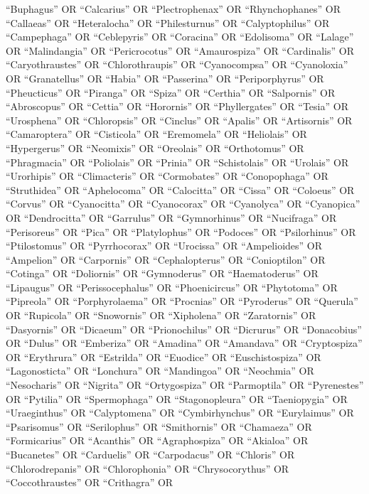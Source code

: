 \documentclass[
  number,
  review,
  onecolumn]{elsarticle}
\begin{document}
``Buphagus'' OR ``Calcarius'' OR ``Plectrophenax'' OR ``Rhynchophanes''
OR ``Callaeas'' OR ``Heteralocha'' OR ``Philesturnus'' OR
``Calyptophilus'' OR ``Campephaga'' OR ``Ceblepyris'' OR ``Coracina'' OR
``Edolisoma'' OR ``Lalage'' OR ``Malindangia'' OR ``Pericrocotus'' OR
``Amaurospiza'' OR ``Cardinalis'' OR ``Caryothraustes'' OR
``Chlorothraupis'' OR ``Cyanocompsa'' OR ``Cyanoloxia'' OR
``Granatellus'' OR ``Habia'' OR ``Passerina'' OR ``Periporphyrus'' OR
``Pheucticus'' OR ``Piranga'' OR ``Spiza'' OR ``Certhia'' OR
``Salpornis'' OR ``Abroscopus'' OR ``Cettia'' OR ``Horornis'' OR
``Phyllergates'' OR ``Tesia'' OR ``Urosphena'' OR ``Chloropsis'' OR
``Cinclus'' OR ``Apalis'' OR ``Artisornis'' OR ``Camaroptera'' OR
``Cisticola'' OR ``Eremomela'' OR ``Heliolais'' OR ``Hypergerus'' OR
``Neomixis'' OR ``Oreolais'' OR ``Orthotomus'' OR ``Phragmacia'' OR
``Poliolais'' OR ``Prinia'' OR ``Schistolais'' OR ``Urolais'' OR
``Urorhipis'' OR ``Climacteris'' OR ``Cormobates'' OR ``Conopophaga'' OR
``Struthidea'' OR ``Aphelocoma'' OR ``Calocitta'' OR ``Cissa'' OR
``Coloeus'' OR ``Corvus'' OR ``Cyanocitta'' OR ``Cyanocorax'' OR
``Cyanolyca'' OR ``Cyanopica'' OR ``Dendrocitta'' OR ``Garrulus'' OR
``Gymnorhinus'' OR ``Nucifraga'' OR ``Perisoreus'' OR ``Pica'' OR
``Platylophus'' OR ``Podoces'' OR ``Psilorhinus'' OR ``Ptilostomus'' OR
``Pyrrhocorax'' OR ``Urocissa'' OR ``Ampelioides'' OR ``Ampelion'' OR
``Carpornis'' OR ``Cephalopterus'' OR ``Conioptilon'' OR ``Cotinga'' OR
``Doliornis'' OR ``Gymnoderus'' OR ``Haematoderus'' OR ``Lipaugus'' OR
``Perissocephalus'' OR ``Phoenicircus'' OR ``Phytotoma'' OR ``Pipreola''
OR ``Porphyrolaema'' OR ``Procnias'' OR ``Pyroderus'' OR ``Querula'' OR
``Rupicola'' OR ``Snowornis'' OR ``Xipholena'' OR ``Zaratornis'' OR
``Dasyornis'' OR ``Dicaeum'' OR ``Prionochilus'' OR ``Dicrurus'' OR
``Donacobius'' OR ``Dulus'' OR ``Emberiza'' OR ``Amadina'' OR
``Amandava'' OR ``Cryptospiza'' OR ``Erythrura'' OR ``Estrilda'' OR
``Euodice'' OR ``Euschistospiza'' OR ``Lagonosticta'' OR ``Lonchura'' OR
``Mandingoa'' OR ``Neochmia'' OR ``Nesocharis'' OR ``Nigrita'' OR
``Ortygospiza'' OR ``Parmoptila'' OR ``Pyrenestes'' OR ``Pytilia'' OR
``Spermophaga'' OR ``Stagonopleura'' OR ``Taeniopygia'' OR
``Uraeginthus'' OR ``Calyptomena'' OR ``Cymbirhynchus'' OR
``Eurylaimus'' OR ``Psarisomus'' OR ``Serilophus'' OR ``Smithornis'' OR
``Chamaeza'' OR ``Formicarius'' OR ``Acanthis'' OR ``Agraphospiza'' OR
``Akialoa'' OR ``Bucanetes'' OR ``Carduelis'' OR ``Carpodacus'' OR
``Chloris'' OR ``Chlorodrepanis'' OR ``Chlorophonia'' OR
``Chrysocorythus'' OR ``Coccothraustes'' OR ``Crithagra'' OR
\end{document}
